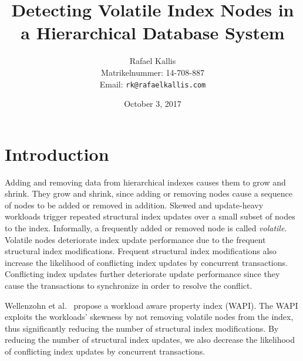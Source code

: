 \documentclass[abstracton,12pt]{scrreprt}
\title{Detecting Volatile Index Nodes in a Hierarchical Database System}
\author{
  Rafael Kallis\\[-5pt]
  \scriptsize Matrikelnummer: 14-708-887\\[-5pt]
  \scriptsize Email: \texttt{rk@rafaelkallis.com}
}
\date{\vspace*{2cm}October 3, 2017}
\begin{document}
\maketitle





\chapter{Introduction}

Adding and removing data from hierarchical indexes causes them to grow and shrink.
They grow and shrink, since adding or removing nodes cause a sequence of nodes to be added or removed in addition.
Skewed and update-heavy workloads trigger repeated structural index updates over a small subset of nodes to the index.
Informally, a frequently added or removed node is called \textit{volatile}.
Volatile nodes deteriorate index update performance due to the frequent structural index modifications.
Frequent structural index modifications also increase the likelihood of conflicting index updates by concurrent transactions.
Conflicting index updates further deteriorate update performance since they cause the transactions to synchronize in order to resolve the conflict.




Wellenzohn et al.~\cite{KW17} propose a workload aware property index (WAPI). 
The WAPI exploits the workloads' skewness by not removing volatile nodes from the index, 
thus significantly reducing the number of structural index modifications.
By reducing the number of structural index updates, we also decrease the likelihood
of conflicting index updates by concurrent transactions.
\end{document}
